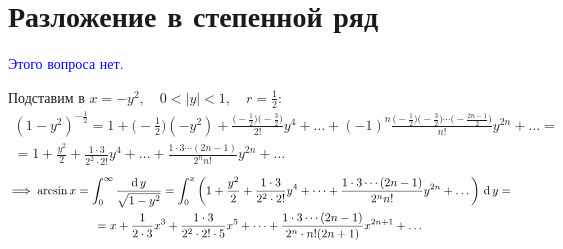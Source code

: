 \section{Разложение в степенной ряд }

\textcolor{blue}{\huge Этого вопроса нет.}

Подставим в  $ x = -y^2, \quad 0 < |y| < 1, \quad r = \frac12 $:
\begin{multline*}
	(1 - y^2)^{-\frac12} = 1 + \bigg( -\frac12 \bigg) (-y^2) + \frac{\big( -\frac12 \big)\big( -\frac32 \big)}{2!}y^4 + \dots + (-1)^n \frac{\big( -\frac12 \big) \big( -\frac32 \big) \cdots \big( -\frac{2n - 1}2 \big)}{n!}y^{2n} + \dots = \\
	= 1 + \frac{y^2}2 + \frac{1 \cdot 3}{2^2 \cdot 2!}y^4 + \dots + \frac{1 \cdot 3 \cdots (2n - 1)}{2^nn!}y^{2n} + \dots
\end{multline*}
\begin{multline*}
	\implies \arcsin x = \dfint[y]0\infty{\sqrt{1 - y^2}} = \dint[y]0x{\bigg( 1 + \frac{y^2}2 + \frac{1 \cdot 3}{2^2 \cdot 2!}y^4 + \dots + \frac{1 \cdot 3 \cdots (2n - 1)}{2^nn!}y^{2n} + \dots \bigg)} = \\
	= x + \frac1{2 \cdot 3}x^3 + \frac{1 \cdot 3}{2^2 \cdot 2! \cdot 5}x^5 + \dots + \frac{1 \cdot 3 \cdots (2n - 1)}{2^n \cdot n!(2n + 1)}x^{2n + 1} + \dots
\end{multline*}
